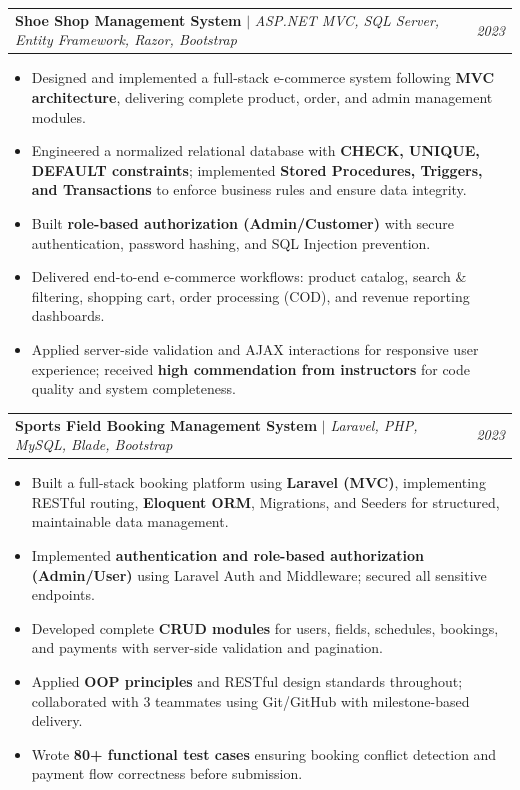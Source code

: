 \documentclass[letterpaper,11pt]{article}
\makeatletter
\newcommand{\resumeItem}[1]{
  \item\small{
    {#1 \vspace{-2pt}}
  }
}
\newcommand{\resumeProjectHeading}[2]{
    \item
    \begin{tabular*}{0.97\textwidth}{l@{\extracolsep{\fill}}r}
      \small#1 & #2 \\
    \end{tabular*}\vspace{-7pt}
}
\newcommand{\resumeItemListStart}{\begin{itemize}}
\newcommand{\resumeItemListEnd}{\end{itemize}\vspace{-5pt}}
\makeatother
\begin{document}
      \vspace{6pt}

      \resumeProjectHeading
        {\textbf{Shoe Shop Management System} $|$ \emph{ASP.NET MVC, SQL Server, Entity Framework, Razor, Bootstrap}}{\emph{2023}}
        \resumeItemListStart
            \resumeItem{Designed and implemented a full-stack e-commerce system following \textbf{MVC architecture}, delivering complete product, order, and admin management modules.}
            \resumeItem{Engineered a normalized relational database with \textbf{CHECK, UNIQUE, DEFAULT constraints}; implemented \textbf{Stored Procedures, Triggers, and Transactions} to enforce business rules and ensure data integrity.}
            \resumeItem{Built \textbf{role-based authorization (Admin/Customer)} with secure authentication, password hashing, and SQL Injection prevention.}
            \resumeItem{Delivered end-to-end e-commerce workflows: product catalog, search \& filtering, shopping cart, order processing (COD), and revenue reporting dashboards.}
            \resumeItem{Applied server-side validation and AJAX interactions for responsive user experience; received \textbf{high commendation from instructors} for code quality and system completeness.}
        \resumeItemListEnd

      \vspace{6pt}

      \resumeProjectHeading
        {\textbf{Sports Field Booking Management System} $|$ \emph{Laravel, PHP, MySQL, Blade, Bootstrap}}{\emph{2023}}
        \resumeItemListStart
            \resumeItem{Built a full-stack booking platform using \textbf{Laravel (MVC)}, implementing RESTful routing, \textbf{Eloquent ORM}, Migrations, and Seeders for structured, maintainable data management.}
            \resumeItem{Implemented \textbf{authentication and role-based authorization (Admin/User)} using Laravel Auth and Middleware; secured all sensitive endpoints.}
            \resumeItem{Developed complete \textbf{CRUD modules} for users, fields, schedules, bookings, and payments with server-side validation and pagination.}
            \resumeItem{Applied \textbf{OOP principles} and RESTful design standards throughout; collaborated with 3 teammates using Git/GitHub with milestone-based delivery.}
            \resumeItem{Wrote \textbf{80+ functional test cases} ensuring booking conflict detection and payment flow correctness before submission.}
        \resumeItemListEnd

      \vspace{6pt}
\end{document}
